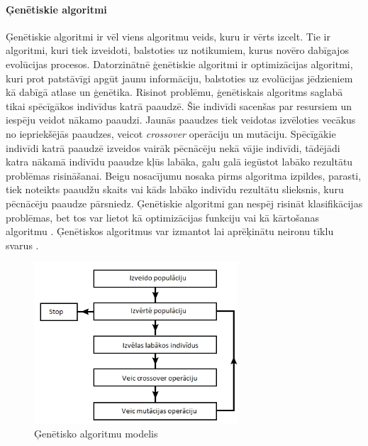 \paragraph{Ģenētiskie algoritmi}
\hfill\par
Ģenētiskie algoritmi ir vēl viens algoritmu veids, kuru ir vērts izcelt. Tie ir algoritmi, kuri tiek izveidoti, balstoties uz notikumiem, kurus novēro dabīgajos evolūcijas procesos. Datorzinātnē ģenētiskie algoritmi ir optimizācijas algoritmi, kuri prot patstāvīgi apgūt jaunu informāciju, balstoties uz evolūcijas jēdzieniem kā dabīgā atlase un ģenētika. Risinot problēmu, ģenētiskais algoritms saglabā tikai spēcīgākos indivīdus katrā paaudzē. Šie indivīdi sacenšas par resursiem un iespēju veidot nākamo paaudzi. Jaunās paaudzes tiek veidotas izvēloties vecākus no iepriekšējās paaudzes, veicot \textit{crossover} operāciju un mutāciju. Spēcīgākie indivīdi katrā paaudzē izveidos vairāk pēcnācēju nekā vājie indivīdi, tādējādi katra nākamā indivīdu paaudze kļūs labāka, galu galā iegūstot labāko rezultātu problēmas risināšanai. Beigu nosacījumu nosaka pirms algoritma izpildes, parasti, tiek noteikts paaudžu skaits vai kāds labāko indivīdu rezultātu slieksnis, kuru pēcnācēju paaudze pārsniedz. Ģenētiskie algoritmi gan nespēj risināt klasifikācijas problēmas, bet tos var lietot kā optimizācijas funkciju \cite{genopti} vai kā kārtošanas algoritmu \cite{deb2000fast}. Ģenētiskos algoritmus var izmantot lai aprēķinātu neironu tīklu svarus \cite{genalg}.
\begin{figure}[h]%
	\centering
	\includegraphics[height=6cm]{images/gen-algo-bilde.png} %
	\caption{Ģenētisko algoritmu modelis}%
	\label{fig:example}%
\end{figure}
